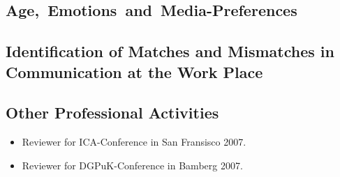

\subsection{\mbox{Age, Emotions and Media-Preferences}}



\subsection{Identification of Matches and Mismatches in Communication at the Work Place}



\enlargethispage{2cm}
\subsection{Other Professional Activities}

\begin{itemize}
\item Reviewer for ICA-Conference in San Fransisco 2007.
\item Reviewer for DGPuK-Conference in Bamberg 2007.	
\end{itemize}
